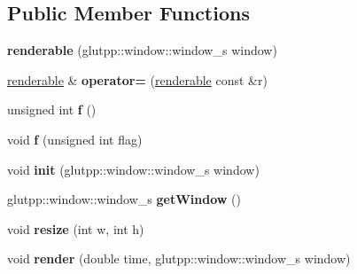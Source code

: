 \subsection*{\-Public \-Member \-Functions}
\begin{DoxyCompactItemize}
\item 
\hypertarget{classglutpp_1_1renderable_a110ba775c50416d8d018046dfb523ff5}{{\bfseries renderable} (glutpp\-::window\-::window\-\_\-s window)}\label{classglutpp_1_1renderable_a110ba775c50416d8d018046dfb523ff5}

\item 
\hypertarget{classglutpp_1_1renderable_a7c18c1b5d009a3fb73f86e335ffcc556}{\hyperlink{classglutpp_1_1renderable}{renderable} \& {\bfseries operator=} (\hyperlink{classglutpp_1_1renderable}{renderable} const \&r)}\label{classglutpp_1_1renderable_a7c18c1b5d009a3fb73f86e335ffcc556}

\item 
\hypertarget{classglutpp_1_1renderable_aac705af4136c474069d851a9520f5720}{unsigned int {\bfseries f} ()}\label{classglutpp_1_1renderable_aac705af4136c474069d851a9520f5720}

\item 
\hypertarget{classglutpp_1_1renderable_a971cd016cc408f732f5d0460744e2a48}{void {\bfseries f} (unsigned int flag)}\label{classglutpp_1_1renderable_a971cd016cc408f732f5d0460744e2a48}

\item 
\hypertarget{classglutpp_1_1renderable_a7a7d55f4efcd6214ad4b83d03807d8e7}{void {\bfseries init} (glutpp\-::window\-::window\-\_\-s window)}\label{classglutpp_1_1renderable_a7a7d55f4efcd6214ad4b83d03807d8e7}

\item 
\hypertarget{classglutpp_1_1renderable_a33656881f53f9be7bab71ea5cc316ef1}{glutpp\-::window\-::window\-\_\-s {\bfseries get\-Window} ()}\label{classglutpp_1_1renderable_a33656881f53f9be7bab71ea5cc316ef1}

\item 
\hypertarget{classglutpp_1_1renderable_abd73b2bba233d1ff95fe46496888a5cf}{void {\bfseries resize} (int w, int h)}\label{classglutpp_1_1renderable_abd73b2bba233d1ff95fe46496888a5cf}

\item 
\hypertarget{classglutpp_1_1renderable_a4a801adc4038a97e52224e5b71df145d}{void {\bfseries render} (double time, glutpp\-::window\-::window\-\_\-s window)}\label{classglutpp_1_1renderable_a4a801adc4038a97e52224e5b71df145d}

\end{DoxyCompactItemize}
